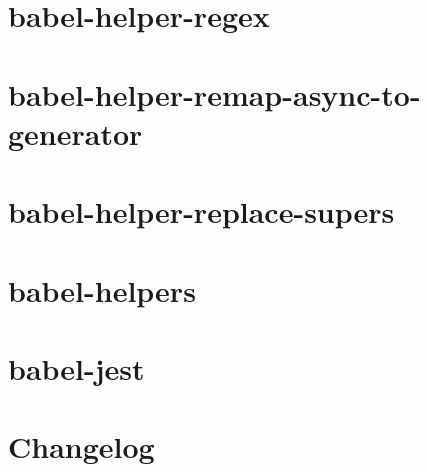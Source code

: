 \documentclass[twoside]{book}
\newcommand{\+}{\discretionary{\mbox{\scriptsize$\hookleftarrow$}}{}{}}
\begin{document}
\chapter{babel-\/helper-\/regex}
\label{md__c_1_workspace_demo_src_main_script_node_modules_babel-helper-regex__r_e_a_d_m_e}

\chapter{babel-\/helper-\/remap-\/async-\/to-\/generator}
\label{md__c_1_workspace_demo_src_main_script_node_modules_babel-helper-remap-async-to-generator__r_e_a_d_m_e}

\chapter{babel-\/helper-\/replace-\/supers}
\label{md__c_1_workspace_demo_src_main_script_node_modules_babel-helper-replace-supers__r_e_a_d_m_e}

\chapter{babel-\/helpers}
\label{md__c_1_workspace_demo_src_main_script_node_modules_babel-helpers__r_e_a_d_m_e}

\chapter{babel-\/jest}
\label{md__c_1_workspace_demo_src_main_script_node_modules_babel-jest__r_e_a_d_m_e}

\chapter{Changelog}
\label{md__c_1_workspace_demo_src_main_script_node_modules_babel-loader__c_h_a_n_g_e_l_o_g}

\end{document}
